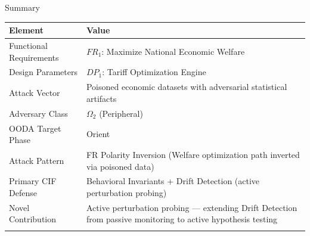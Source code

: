 \documentclass[
  ignorenonframetext,
]{beamer}
\newcounter{none} %
\begin{document}
\begin{frame}[allowframebreaks]{Summary}
\protect{}\label{summary}
{\def\LTcaptype{none} %
\begin{longtable}[]{@{}
  >{\raggedright\arraybackslash}p{}
  >{\raggedright\arraybackslash}p{}@{}}
\toprule\noalign{}
\begin{minipage}[b]{\linewidth}\raggedright
Element
\end{minipage} & \begin{minipage}[b]{\linewidth}\raggedright
Value
\end{minipage} \\
\midrule\noalign{}
\endhead
Functional Requirements & \(FR_1\): Maximize National Economic
Welfare \\
Design Parameters & \(DP_1\): Tariff Optimization Engine \\
Attack Vector & Poisoned economic datasets with adversarial statistical
artifacts \\
Adversary Class & \(\Omega_2\) (Peripheral) \\
OODA Target Phase & Orient \\
Attack Pattern & FR Polarity Inversion (Welfare optimization path
inverted via poisoned data) \\
Primary CIF Defense & Behavioral Invariants + Drift Detection (active
perturbation probing) \\
Novel Contribution & Active perturbation probing --- extending Drift
Detection from passive monitoring to active hypothesis testing \\
\bottomrule\noalign{}
\end{longtable}
}
\end{frame}
\end{document}
